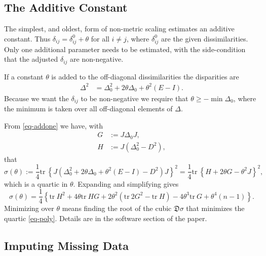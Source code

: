 \documentclass[
  12pt,
  letterpaper,
  DIV=11,
  numbers=noendperiod]{scrartcl}
\begin{document}
\subsection{The Additive Constant}\label{the-additive-constant}

The simplest, and oldest, form of non-metric scaling estimates an
additive constant. Thus \(\delta_{ij}=\delta_{ij}^0+\theta\) for all
\(i\not= j\), where \(\delta_{ij}^0\) are the given dissimilarities.
Only one additional parameter needs to be estimated, with the
side-condition that the adjusted \(\delta_{ij}\) are non-negative.

If a constant \(\theta\) is added to the off-diagonal dissimilarities
the disparities are \begin{align}
\Delta^2&=\Delta_0^2+2\theta\Delta_0+\theta^2(E-I).\label{eq-addone}
\end{align} Because we want the \(\delta_{ij}\) to be non-negative we
require that \(\theta\geq-\min\Delta_0\), where the minimum is taken
over all off-diagonal elements of \(\Delta\).

From \eqref{eq-addone} we have, with \begin{subequations}
\begin{align}
G&:=J\Delta_0J,\label{eq-gdef}\\
H&:=J(\Delta_0^2-D^2)\label{eq-hdef},
\end{align}
\end{subequations} that \begin{equation}
\sigma(\theta):=\frac14\text{tr}\ \left\{J(\Delta_0^2+2\theta\Delta_0+\theta^2(E-I)-D^2)J\right\}^2=\frac14\text{tr}\ \left\{H+2\theta G-\theta^2 J\right\}^2,\label{eq-straint2}
\end{equation} which is a quartic in \(\theta\). Expanding and
simplifying gives \begin{equation}
\sigma(\theta)=\frac14\left\{\text{tr}\ H^2+4\theta\text{tr}\ HG+2\theta^2(\text{tr}\ 2G^2-\text{tr}\ H)-4\theta^3\text{tr}\ G+\theta^4(n-1)\right\}.\label{eq-poly}
\end{equation} Minimizing over \(\theta\) means finding the root of the
cubic \(\mathfrak{D}\sigma\) that minimizes the quartic \eqref{eq-poly}.
Details are in the software section of the paper.

\subsection{Imputing Missing Data}\label{imputing-missing-data}
\end{document}
